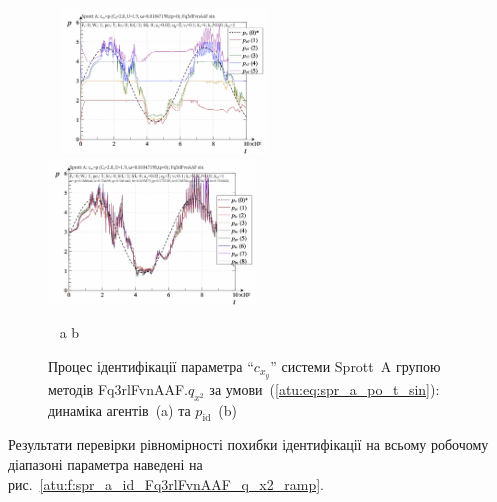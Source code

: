 \begin{figure}[htb!]
\begin{center}
  ~ \hfill
    \includegraphics[width=0.49\textwidth]{p/cha/spr_a/Fq3rlFvnAAF_x2/sprott_a_id-p_t_pi_Fq3rlFvnAAF_sin.png}
    \hfill
    \includegraphics[width=0.49\textwidth]{p/cha/spr_a/Fq3rlFvnAAF_x2/sprott_a_id-p_t_p_Fq3rlFvnAAF_sin.png}
  \hfill ~
\end{center}
  \vspace{-1.0ex}
  \begin{center}
    ~ \hfill a \hfill\hfill b \hfill ~
  \end{center}
\caption{Процес ідентифікації параметра ``$c_{x_y}$'' системи Sprott~A групою методів Fq3rlFvnAAF.$q_{x^2}$ за умови~(\ref{atu:eq:spr_a_po_t_sin}): динаміка агентів~(a) та $p_\mathrm{id}$~(b)}
\label{atu:f:spr_a_id_Fq3rlFvnAAF_q_x2_sin}
\end{figure}

Результати перевірки рівномірності похибки ідентифікації
на всьому робочому діапазоні параметра наведені на
рис.~\ref{atu:f:spr_a_id_Fq3rlFvnAAF_q_x2_ramp}.



